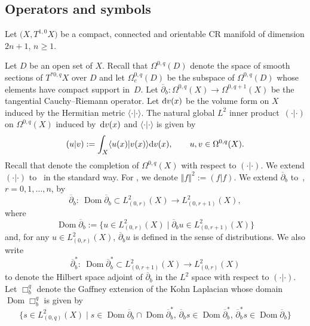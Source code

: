 \documentclass[10pt,a4paper]{amsart}
\numberwithin{equation}{section}
\newcommand{\ddbar}{\overline\partial}
\newcommand{\pr}{\partial}
\newcommand{\ol}{\overline}
\newcommand{\norm}[1]{\left\Vert#1\right\Vert}
\newcommand{\To}{\rightarrow}
\begin{document}
	 \subsection{Operators and symbols} \label{sec:crmanif}
	
	 Let $\bigl(X, T^{1,0}X\bigr)$ be a compact, connected and orientable CR manifold of dimension $2n+1$, $n\geq 1$.
	
	 Let $D$ be an open set of $X$. Recall that $\Omega^{0,q}(D)$ denote the space of smooth sections of $T^{*0,q}X$ over $D$ and let $\Omega^{0,q}_c(D)$ be the subspace of $\Omega^{0,q}(D)$ whose elements have compact support in~$D$. Let
$
	 \ddbar_b\colon\Omega^{0,q}(X)\To\Omega^{0,q+1}(X)
$
	 be the tangential Cauchy--Riemann operator. Let ${\rm d}v(x)$ be the volume form on $X$ induced by the Hermitian metric $\langle \cdot | \cdot \rangle$.
	 The natural global $L^2$ inner product~$( \cdot | \cdot )$ on $\Omega^{0,q}(X)$
	 induced by~${\rm d}v(x)$ and $\langle \cdot | \cdot \rangle$ is given by
	 \[
	 ( u | v ):=\int_X\langle u(x) | v(x) \rangle {\rm d}v(x) ,\qquad u,v\in\Omega^{0,q}(X) .
	 \]
	 Recall that  denote
	 the completion of $\Omega^{0,q}(X)$ with respect to $( \cdot | \cdot )$.
	 We extend $( \cdot | \cdot )$ to~
	 in the standard way. For , we denote $\norm{f}^2:=( f | f )$.
	 We extend
	 $\ddbar_{b}$ to~, $r=0,1,\dots,n$, by
	 \[
	 \ddbar_{b}\colon \ \operatorname{Dom}\ddbar_{b}\subset L^2_{(0,r)}(X)\To L^2_{(0,r+1)}(X) ,
	 \]
	 where \[\operatorname{Dom}\ddbar_{b}:=\big\{u\in L^2_{(0,r)}(X)\mid \ddbar_{b}u\in L^2_{(0,r+1)}(X)\big\}\] and, for any $u\in L^2_{(0,r)}(X)$, $\ddbar_{b} u$ is defined in the sense of distributions.
	 We also write
	 \[
	 \ol{\pr}^{*}_{b}\colon \ \operatorname{Dom}\ol{\pr}^{*}_{b}\subset L^2_{(0,r+1)}(X)\To L^2_{(0,r)}(X)
	 \]
	 to denote the Hilbert space adjoint of $\ddbar_{b}$ in the $L^2$ space with respect to $( \cdot | \cdot )$.
	 Let $\Box^{q}_{b}$ denote the Gaffney extension of the Kohn Laplacian whose domain $\operatorname{Dom}\Box^q_{b}$ is given by
	 \begin{equation*}
	 		\big\{s\in L^2_{(0,q)}(X)\mid
	 		s\in\operatorname{Dom}\ddbar_{b}\cap\operatorname{Dom}\ol{\pr}^{*}_{b},\,
	 		\ddbar_{b}s\in\operatorname{Dom}\ol{\pr}^{*}_{b}, \, \ol{\pr}^{*}_{b}s\in\operatorname{Dom}\ddbar_{b}\big\}
	 \end{equation*}
\end{document}

